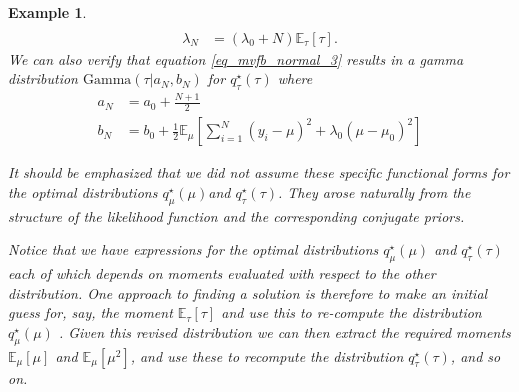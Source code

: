 \documentclass[10pt ]{article}
\newtheorem{example}{Example}
\begin{document}
\begin{example}
{\begin{align}
\\
\lambda_N &= \left( \lambda_0 + N \right) \mathbb{E}_{\tau} \left[ \tau \right].
\label{eq_mvfb_normal_42}
\end{align} 
 We can also verify that equation \eqref{eq_mvfb_normal_3} results in a gamma distribution $\mathrm{Gamma}(\tau | a_N, b_N)$ for $q^{\star}_{\tau} (\tau) $ where
\begin{align}
a_N &= a_0 + \frac{N+1}{2}
\label{eq_mvfb_normal_51} 
\\
b_N &= b_0 + \frac{1}{2} \mathbb{E}_{\mu} \left[ \sum_{i=1}^N (y_i - \mu)^2 + \lambda_0  (\mu -\mu_0)^2 \right]
\label{eq_mvfb_normal_52}
\end{align}

It should be emphasized that we did not assume these specific functional forms for the optimal distributions $q^{\star}_{\mu} (\mu)$and $q^{\star}_{\tau} (\tau)$. They arose naturally from the structure of the likelihood function and the corresponding conjugate priors. 

Notice that we have expressions for the optimal distributions $q^{\star}_{\mu} (\mu)$ and $q^{\star}_{\tau} (\tau)$ each of which depends on moments evaluated with respect to the other distribution. One approach to finding a solution is therefore to make an initial guess for, say, the moment $\mathbb{E}_{\tau} \left[ \tau \right]$ and use this to re-compute the distribution $q^{\star}_{\mu} (\mu)$ . Given this revised distribution we can then extract the required moments $\mathbb{E}_{\mu} \left[ \mu \right]$ and $\mathbb{E}_{\mu} \left[ \mu^2 \right]$, and use these to recompute the distribution $q^{\star}_{\tau} (\tau)$, and so on.

}
\end{example}
\end{document}
